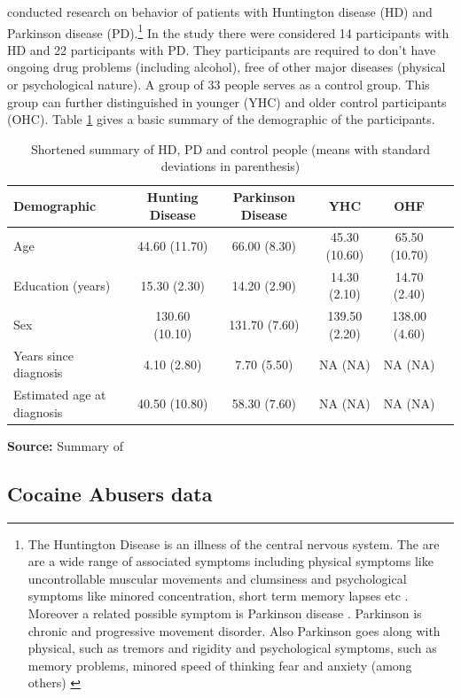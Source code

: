 \documentclass[12pt,a4paper,bibliography=totocnumbered,listof=totocnumbered]{scrartcl}
\begin{document}
\cite{Stout2001} conducted research on behavior of patients with Huntington disease (HD) and Parkinson disease (PD).\footnote{The Huntington Disease is an illness of the central nervous system. The are are a wide range of associated symptoms including physical symptoms like uncontrollable muscular movements and clumsiness and psychological symptoms like minored concentration, short term memory lapses etc . Moreover a related possible symptom is Parkinson disease \cite{hunt}. Parkinson is chronic and progressive movement  disorder. Also Parkinson goes along with physical, such as tremors and rigidity and psychological symptoms, such as memory problems, minored speed of thinking fear and anxiety (among others) \cite{parc}} 
In the study there were considered 14 participants with HD and 22 participants with PD. They participants are required to don't have ongoing drug problems (including alcohol), free of other major diseases (physical or psychological nature). A group of 33 people serves as a control group. This group can further distinguished in younger (YHC) and older control participants (OHC). Table \ref{tab:hus} gives a basic summary of the demographic of the participants.

\setlength{\tabcolsep}{10pt}
\renewcommand{\arraystretch}{1}
\begin{table}[!htbp]
	\centering 
	\scriptsize
	\begin{tabularx}{\textwidth}{lccccc}
		\toprule
		\textbf{Demographic} & \textbf{Hunting Disease} & \textbf{Parkinson Disease} & \textbf{YHC} & \textbf{OHF} \\
		\hline
		Age & 		44.60 (11.70) & 66.00 (8.30) & 45.30 (10.60) & 65.50 (10.70) \\
		Education (years) & 15.30 (2.30) & 14.20 (2.90) & 14.30 (2.10) &14.70 (2.40) \\
		Sex & 130.60 (10.10) & 131.70 (7.60) & 139.50 (2.20) & 138.00 (4.60) \\
		Years since diagnosis & 4.10 (2.80) & 7.70 (5.50) & NA (NA) & NA (NA) \\
		Estimated age at diagnosis & 40.50 (10.80) & 58.30 (7.60) & NA (NA) & NA (NA) \\
		\bottomrule
	\end{tabularx}
	\caption{Shortened summary of HD, PD and control people (means with standard deviations in parenthesis)}
	\label{tab:hus}
	\textbf{Source:} Summary of \cite[page 3]{Stout2001} 
\end{table}


\subsection{Cocaine Abusers data}
\end{document}
